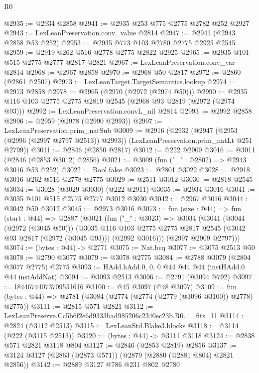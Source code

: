 \begin{lexlean}{R0}
\begin{coremodule}
@2935 := @2934 @2858
@2941 := @2935 @253 @775 @2775 @2782 @252 @2927
@2943 := LexLeanPreservation.conv_value @2814
@2947 := @2941 (@2943 @2858 @53 @252)
@2953 := @2935 @773 @103 @2780 @2775 @2925 @2545
@2959 := @2919 @262 @516 @2778 @2775 @2822 @2925
@2965 := @2935 @101 @515 @2775 @2777 @2817 @2821
@2967 := LexLeanPreservation.conv_var @2814
@2968 := @2967 @2858
@2970 := @2968 @50 @2817
@2972 := @2860 (@2861 @2507)
@2973 := LexLeanTarget.TargetSemantics.lookup
@2974 := @2973 @2858
@2978 := @2965 (@2970 (@2972 (@2974 @50)))
@2990 := @2935 @116 @103 @2775 @2775 @2819 @2545 (@2968 @93 @2819 (@2972 (@2974 @93)))
@2992 := LexLeanPreservation.convL_nil @2814
@2993 := @2992 @2858
@2996 := @2959 (@2978 (@2990 @2993))
@2997 := LexLeanPreservation.prim_natSub
@3009 := @2916
    (@2932
      (@2947 (@2953 (@2996 (@2997 @2797 @2513)) @2993))
      (LexLeanPreservation.prim_natLt @251 @2799))
@3011 := @2846 (@2850 @2817)
@3012 := @222 @2909
@3016 := @3011 (@2846 (@2853 @3012) @2856)
@3021 := @3009 (fun ("_" : @2802) => @2943 @3016 @53 @252)
@3022 := Bool.false
@3023 := @2801 @3022
@3028 := @2918 @3016 @262 @516 @2778 @2775
@3029 := @2511 @3012
@3030 := @2818 @2545
@3034 := @3028 (@3029 @3030) (@222 @2911)
@3035 := @2934 @3016
@3041 := @3035 @101 @515 @2775 @2777 @3012 @3030
@3042 := @2967 @3016
@3044 := @3042 @50 @3012
@3045 := @2973 @3016
@3073 := fun (size : @44) =>
  fun (start : @44) =>
  @2887
    (@3021
      (fun ("_" : @3023) =>
      @3034
        (@3041
          (@3044 (@2972 (@3045 @50)))
          (@3035
            @116
            @103
            @2775
            @2775
            @2817
            @2545
            (@3042 @93 @2817 (@2972 (@3045 @93)))
            (@2992 @3016)))
        (@2997 @2909 @2797)))
@3074 := (bytes : @44) -> @2771
@3075 := Nat.beq
@3077 := @3075 @2513 @50
@3078 := @2790 @3077
@3079 := @3078 @2775
@3084 := @2788 @3079 (@2804 @3077 @2775) @2775
@3093 := HAdd.hAdd.{0, 0, 0} @44 @44 @44 (instHAdd.{0} @44 instAddNat)
@3094 := @3093 @2513
@3096 := @2791 (@3094 @792)
@3097 := 18446744073709551616
@3100 := @45 @3097 (@48 @3097)
@3109 := fun (bytes : @44) => @2781 (@3084 (@2774 (@2774 (@2779 (@3096 @3100)) @2778) @2775))
@3111 := @2815 @571 @2821
@3112 := LexLeanPreserve.Cc5b6f2e6d9333bad985206c2340ec23b.R0.__fits_11
@3114 := @2824 (@3112 @2513)
@3115 := LexLeanStd.Blake3.blocks
@3118 := @3114 (@222 (@3115 @2513))
@3120 := (bytes : @44) -> @3111 @3118
@3124 := @2838 @571 @2821 @3118 @804
@3127 := @2846 (@2853 @2819) @2856
@3137 := @3124 @3127 (@2863 (@2873 @571)) (@2879 (@2880 (@2881 @804) @2821 @2856))
@3142 := @2889 @3127 @786 @231 @802 @2780

\end{coremodule}
\end{lexlean}
